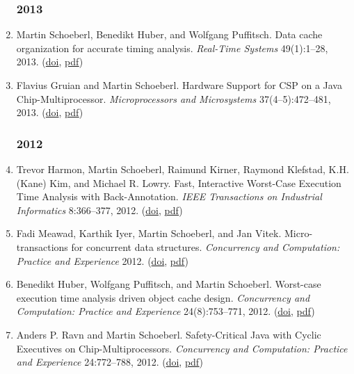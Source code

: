 \begin{enumerate}
\subsubsection*{2013}

\item Martin Schoeberl, Benedikt Huber, and Wolfgang Puffitsch.
 Data cache organization for accurate timing analysis.
 \emph{Real-Time Systems} 49(1):1--28, 2013.
(\href{http://dx.doi.org/10.1007/s11241-012-9159-8}{doi}, \href{http://www.jopdesign.com/doc/dcache_wcet.pdf}{pdf})

\item Flavius Gruian and Martin Schoeberl.
 Hardware Support for CSP on a Java Chip-Multiprocessor.
 \emph{Microprocessors and Microsystems} 37(4--5):472--481, 2013.
(\href{http://dx.doi.org/10.1016/j.micpro.2012.08.004}{doi}, \href{http://www.jopdesign.com/doc/csp_jop_micpro.pdf}{pdf})


\subsubsection*{2012}

\item Trevor Harmon, Martin Schoeberl, Raimund Kirner, Raymond Klefstad, K.H. (Kane) Kim, and Michael R. Lowry.
 Fast, Interactive Worst-Case Execution Time Analysis with Back-Annotation.
 \emph{IEEE Transactions on Industrial Informatics} 8:366--377, 2012.
(\href{http://dx.doi.org/10.1109/TII.2012.2187457}{doi}, \href{http://www.jopdesign.com/doc/intwcet.pdf}{pdf})

\item Fadi Meawad, Karthik Iyer, Martin Schoeberl, and Jan Vitek.
 Micro-transactions for concurrent data structures.
 \emph{Concurrency and Computation: Practice and Experience} 2012.
(\href{http://dx.doi.org/10.1002/cpe.2985}{doi}, \href{http://www.jopdesign.com/doc/utran_cpe.pdf}{pdf})

\item Benedikt Huber, Wolfgang Puffitsch, and Martin Schoeberl.
 Worst-case execution time analysis driven object cache design.
 \emph{Concurrency and Computation: Practice and Experience} 24(8):753--771, 2012.
(\href{http://dx.doi.org/10.1002/cpe.1763}{doi}, \href{http://www.jopdesign.com/doc/ocwcet_ccpe.pdf}{pdf})

\item Anders P. Ravn and Martin Schoeberl.
 Safety-Critical Java with Cyclic Executives on Chip-Multiprocessors.
 \emph{Concurrency and Computation: Practice and Experience} 24:772--788, 2012.
(\href{http://dx.doi.org/10.1002/cpe.1754}{doi}, \href{http://www.jopdesign.com/doc/scj0cmp.pdf}{pdf})



\end{enumerate}
